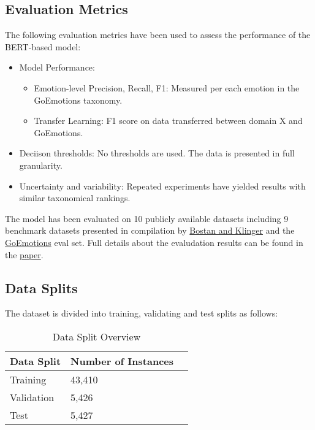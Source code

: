 \documentclass[titlepage]{article}
\begin{document}
\subsection{Evaluation Metrics}
The following evaluation metrics have been used to assess the performance of the BERT-based model:
\begin{itemize}
    \item Model Performance:
        \begin{itemize}
            \item Emotion-level Precision, Recall, F1: Measured per each emotion in the GoEmotions taxonomy.
            \item Transfer Learning: F1 score on data transferred between domain X and GoEmotions.
        \end{itemize}
    \item Deciison thresholds: No thresholds are used. The data is presented in full granularity.
    \item Uncertainty and variability: Repeated experiments have yielded results with similar taxonomical rankings.
\end{itemize}

The model has been evaluated on 10 publicly available datasets including 9 benchmark datasets presented in compilation 
by \href{https://aclanthology.org/C18-1179/}{Bostan and Klinger} and the \href{https://github.com/google-research/google-research/tree/master/goemotions}
{GoEmotions} eval set. Full details about the evaludation results can be found in the \href{https://arxiv.org/pdf/2005.00547}{paper}.

\subsection{Data Splits}
The dataset is divided into training, validating and test splits as follows:

\begin{table}[H] \label{tab:data_split}
    \centering
    \begin{tabular}{lll}
    \toprule
    \textbf{Data Split} & \textbf{Number of Instances} \\
    \midrule
    Training & 43,410 \\
    Validation & 5,426 \\
    Test & 5,427 \\
    \bottomrule
    \end{tabular}
    \caption{Data Split Overview}
\end{table}
\end{document}
